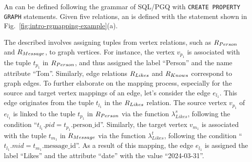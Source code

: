 \begin{example}
    \label{ex:rgmapping}
    An \rgmapping can be defined following the grammar of SQL/PGQ with \lstinline{CREATE PROPERTY GRAPH} statements.
    Given five relations, an \rgmapping is defined with the statement shown in Fig.~\ref{fig:intro-rgmapping-example}(a).

    The described \rgmapping involves assigning tuples from vertex relations, such as ${R_{Person}}$ and ${R_{Message}}$, to graph vertices. For instance, the vertex $v_{p_1}$ is associated with the tuple $t_{p_1}$ in ${R_{Person}}$, and thus assigned the label ``Person'' and the name attribute ``Tom''. Similarly, edge relations ${R_{Likes}}$ and ${R_{Knows}}$ correspond to graph edges.
    To further elaborate on the mapping process, especially for the source and target vertex mappings of an edge, let's consider the edge $e_{l_1}$. This edge originates from the tuple $t_{l_1}$ in the ${R_{Likes}}$ relation. The source vertex $v_{p_1}$ of $e_{l_1}$ is linked to the tuple $t_{p_1}$ in ${R_{Person}}$ via the function $\lambda_{Likes}^s$, following the condition ``$t_{l_1}.pid = t_{p_1}.\text{person\_id}$''. Similarly, the target vertex $v_{m_1}$ is associated with the tuple $t_{m_1}$ in ${R_{Message}}$ via the function $\lambda_{Likes}^t$, following the condition ``$t_{l_1}.mid = t_{m_1}.\text{message\_id}$''. As a result of this mapping, the edge $e_{l_1}$ is assigned the label ``Likes'' and the attribute ``date'' with the value ``2024-03-31''.
\end{example}

